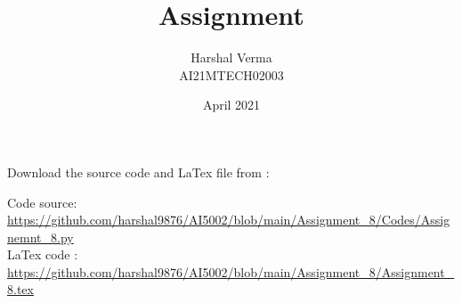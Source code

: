 \documentclass[journal,12pt,twocolumn]{IEEEtran}
\DeclareMathOperator*{\Res}{Res}
\begin{document}
\newcommand{\BEQA}{\begin{eqnarray}}
\newcommand{\EEQA}{\end{eqnarray}}
\newcommand{\define}{\stackrel{\triangle}{=}}

\raggedbottom
\setlength{\parindent}{0pt}
\providecommand{\mbf}{\mathbf}
\providecommand{\pr}[1]{\ensuremath{\Pr\left(#1\right)}}
\providecommand{\qfunc}[1]{\ensuremath{Q\left(#1\right)}}
\providecommand{\fn}[1]{\ensuremath{f\left(#1\right)}}
\providecommand{\e}[1]{\ensuremath{E\left(#1\right)}}
\providecommand{\sbrak}[1]{\ensuremath{{}\left[#1\right]}}
\providecommand{\lsbrak}[1]{\ensuremath{{}\left[#1\right.}}
\providecommand{\rsbrak}[1]{\ensuremath{{}\left.#1\right]}}
\providecommand{\brak}[1]{\ensuremath{\left(#1\right)}}
\providecommand{\lbrak}[1]{\ensuremath{\left(#1\right.}}
\providecommand{\rbrak}[1]{\ensuremath{\left.#1\right)}}
\providecommand{\cbrak}[1]{\ensuremath{\left\{#1\right\}}}
\providecommand{\lcbrak}[1]{\ensuremath{\left\{#1\right.}}
\providecommand{\rcbrak}[1]{\ensuremath{\left.#1\right\}}}
\theoremstyle{remark}
\newtheorem{rem}{Remark}
\newcommand{\sgn}{\mathop{\mathrm{sgn}}}
\providecommand{\abs}[1]{\vert#1\vert}
\providecommand{\res}[1]{\Res\displaylimits_{#1}} 
\providecommand{\norm}[1]{\lVert#1\rVert}
\providecommand{\mtx}[1]{\mathbf{#1}}
\providecommand{\mean}[1]{E[ #1 ]}
\providecommand{\fourier}{\overset{\mathcal{F}}{ \rightleftharpoons}}
\providecommand{\system}{\overset{\mathcal{H}}{ \longleftrightarrow}}
\newcommand{\solution}{\noindent \textbf{Solution: }}
\newcommand{\cosec}{\,\text{cosec}\,}
\providecommand{\dec}[2]{\ensuremath{\overset{#1}{\underset{#2}{\gtrless}}}}
\newcommand{\myvec}[1]{\ensuremath{\begin{pmatrix}#1\end{pmatrix}}}
\newcommand{\mydet}[1]{\ensuremath{\begin{vmatrix}#1\end{vmatrix}}}
\makeatletter
{}
\title{Assignment  }
\author{Harshal Verma\\
AI21MTECH02003}
\date{April 2021}
\maketitle
Download the source code and LaTex file from :
\begin{tcolorbox}
Code source: \url{https://github.com/harshal9876/AI5002/blob/main/Assignment_8/Codes/Assignemnt_8.py} \\
LaTex code :
\url{https://github.com/harshal9876/AI5002/blob/main/Assignment_8/Assignment_8.tex}
\end{tcolorbox}
\end{document}
